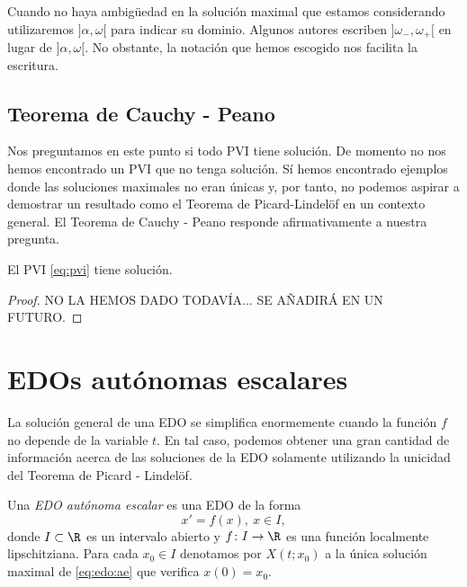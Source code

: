 \documentclass{article}
\begin{document}
Cuando no haya ambigüedad en la solución maximal que estamos considerando utilizaremos
$]\alpha, \omega[$ para indicar su dominio. Algunos autores escriben $]\omega_-, \omega_+[$ en lugar
de $]\alpha, \omega[$. No obstante, la notación que hemos escogido nos facilita la escritura.

\subsection{Teorema de Cauchy - Peano}

Nos preguntamos en este punto si todo PVI tiene solución. De momento no nos hemos encontrado un PVI
que no tenga solución. Sí hemos encontrado ejemplos donde las soluciones maximales no eran únicas y,
por tanto, no podemos aspirar a demostrar un resultado como el Teorema de Picard-Lindelöf en un
contexto general. El Teorema de Cauchy - Peano responde afirmativamente a nuestra pregunta.

\begin{theorem}
  El PVI \eqref{eq:pvi} tiene solución.
\end{theorem}
\begin{proof}
NO LA HEMOS DADO TODAVÍA... SE AÑADIRÁ EN UN FUTURO.
\end{proof}

\newpage

\section{EDOs autónomas escalares} \label{sec:ae}

La solución general de una EDO se simplifica enormemente cuando la función $f$ no depende de la
variable $t$. En tal caso, podemos obtener una gran cantidad de información acerca de las soluciones
de la EDO solamente utilizando la unicidad del Teorema de Picard - Lindelöf.

\begin{definition}
  Una \emph{EDO autónoma escalar} es una EDO de la forma
  \begin{equation}
    \label{eq:edo:ae}
    x' = f(x), \ x \in I,
    \tag{AE}
  \end{equation}
  donde $I \subset \R$ es un intervalo abierto y $f \colon I \to \R$ es una función localmente
  lipschitziana. Para cada $x_0 \in I$ denotamos por $X(t; x_0)$ a la única solución maximal de
  \eqref{eq:edo:ae} que verifica $x(0) = x_0$.
\end{definition}
\end{document}
